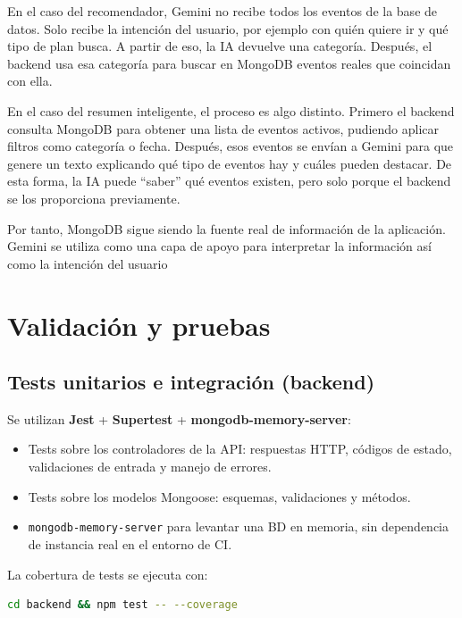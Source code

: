 \documentclass[12pt, a4paper]{article}
\begin{document}
En el caso del recomendador, Gemini no recibe todos los eventos de la base de datos.
Solo recibe la intención del usuario, por ejemplo con quién quiere ir y qué tipo de
plan busca. A partir de eso, la IA devuelve una categoría. Después, el backend usa esa categoría para buscar en MongoDB
eventos reales que coincidan con ella.

En el caso del resumen inteligente, el proceso es algo distinto. Primero el backend
consulta MongoDB para obtener una lista de eventos activos, pudiendo aplicar filtros
como categoría o fecha. Después, esos eventos se envían a Gemini para
que genere un texto explicando qué tipo de eventos hay y cuáles pueden destacar. De
esta forma, la IA puede ``saber'' qué eventos existen, pero solo porque el backend se
los proporciona previamente.

Por tanto, MongoDB sigue siendo la fuente real de información de la aplicación. Gemini
se utiliza como una capa de apoyo para interpretar la información así como la intención del usuario

\section{Validación y pruebas}

\subsection{Tests unitarios e integración (backend)}

Se utilizan \textbf{Jest} + \textbf{Supertest} + \textbf{mongodb-memory-server}:

\begin{itemize}[leftmargin=1.4em]
  \item Tests sobre los controladores de la API: respuestas HTTP, códigos de estado,
    validaciones de entrada y manejo de errores.
  \item Tests sobre los modelos Mongoose: esquemas, validaciones y métodos.
  \item \texttt{mongodb-memory-server} para levantar una BD en memoria, sin dependencia
    de instancia real en el entorno de CI.
\end{itemize}

La cobertura de tests se ejecuta con:

\begin{lstlisting}[language=bash]
cd backend && npm test -- --coverage
\end{lstlisting}
\end{document}
